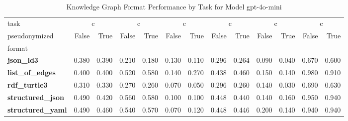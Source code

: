\begin{table}
\caption{Knowledge Graph Format Performance by Task for Model gpt-4o-mini}
\label{tab:results_gpt-4o-mini}
\begin{tabular}{lrrrrrrrrrrrr}
\toprule
task & \multicolumn{2}{c}{c}{AggByRelation} & \multicolumn{2}{c}{c}{AggNeighborProperties} & \multicolumn{2}{c}{c}{HighestDegreeNode} & \multicolumn{2}{c}{c}{Overall} & \multicolumn{2}{c}{c}{ShortestPath} & \multicolumn{2}{c}{c}{TripleRetrieval} \\
pseudonymized & False & True & False & True & False & True & False & True & False & True & False & True \\
format &  &  &  &  &  &  &  &  &  &  &  &  \\
\midrule
\textbf{json_ld3} & 0.380 & 0.390 & 0.210 & 0.180 & 0.130 & 0.110 & 0.296 & 0.264 & 0.090 & 0.040 & 0.670 & 0.600 \\
\textbf{list_of_edges} & 0.400 & 0.400 & 0.520 & 0.580 & 0.140 & 0.270 & 0.438 & 0.460 & 0.150 & 0.140 & 0.980 & 0.910 \\
\textbf{rdf_turtle3} & 0.310 & 0.330 & 0.270 & 0.260 & 0.070 & 0.050 & 0.296 & 0.260 & 0.140 & 0.030 & 0.690 & 0.630 \\
\textbf{structured_json} & 0.490 & 0.420 & 0.560 & 0.580 & 0.100 & 0.100 & 0.448 & 0.440 & 0.140 & 0.160 & 0.950 & 0.940 \\
\textbf{structured_yaml} & 0.490 & 0.460 & 0.540 & 0.570 & 0.070 & 0.120 & 0.448 & 0.446 & 0.200 & 0.140 & 0.940 & 0.940 \\
\bottomrule
\end{tabular}
\end{table}
